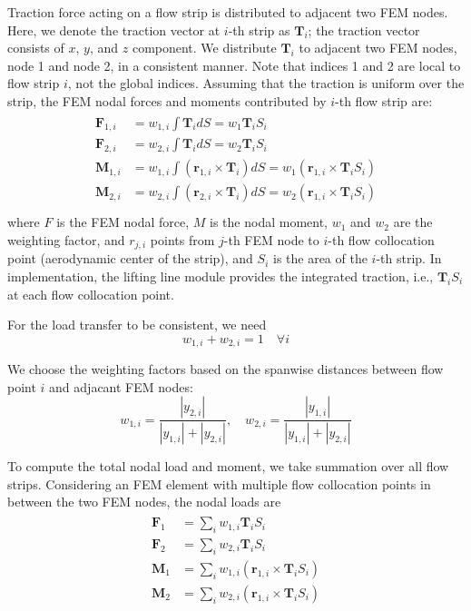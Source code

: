 \documentclass[10pt]{article}
\newcommand{\mb}[1]{\boldsymbol{\mathbf{#1}}} %
\begin{document}
Traction force acting on a flow strip is distributed to adjacent two FEM nodes.
Here, we denote the traction vector at $i$-th strip as $\mb{T}_i$; the traction vector consists of $x$, $y$, and $z$ component.
We distribute $\mb{T}_i$ to adjacent two FEM nodes, node 1 and node 2, in a consistent manner.
Note that indices 1 and 2 are local to flow strip $i$, not the global indices.
Assuming that the traction is uniform over the strip, the FEM nodal forces and moments contributed by $i$-th flow strip are:
\begin{align}
\begin{aligned}
	\mb{F}_{1,i} &= w_{1,i} \int \mb{T}_i dS = w_1 \mb{T}_i S_i\\
	\mb{F}_{2,i} &= w_{2,i} \int\mb{T}_i dS = w_2 \mb{T}_i S_i\\
	\mb{M}_{1,i} &= w_{1,i} \int \left( \mb{r}_{1, i} \times \mb{T}_i \right) dS = w_1 \left( \mb{r}_{1, i} \times \mb{T}_i S_i \right)  \\
	\mb{M}_{2,i} &= w_{2,i} \int \left( \mb{r}_{2, i} \times \mb{T}_i \right) dS = w_2 \left( \mb{r}_{1, i} \times \mb{T}_i S_i \right)  \\
\end{aligned}
\end{align}
where $F$ is the FEM nodal force, $M$ is the nodal moment, $w_1$ and $w_2$ are the weighting factor, and $r_{j, i}$ points from $j$-th FEM node to $i$-th flow collocation point (aerodynamic center of the strip), and $S_i$ is the area of the $i$-th strip.
In implementation, the lifting line module provides the integrated traction, i.e., $\mb{T}_i S_i$ at each flow collocation point.

For the load transfer to be consistent, we need
\begin{equation}
	w_{1,i} + w_{2,i} = 1 \quad \forall i
\end{equation}

We choose the weighting factors based on the spanwise distances between flow point $i$ and adjacant FEM nodes:
\begin{equation}
	w_{1,i} = \frac{|y_{2, i}|}{|y_{1, i}| + |y_{2, i}|}, \quad w_{2,i} = \frac{|y_{1, i}|}{|y_{1, i}| + |y_{2, i}|}
\end{equation}

To compute the total nodal load and moment, we take summation over all flow strips.
Considering an FEM element with multiple flow collocation points in between the two FEM nodes, the nodal loads are
\begin{align}
\begin{aligned}
	\mb{F}_1 &= \sum_i w_{1,i} \mb{T}_i S_i \\
	\mb{F}_2 &= \sum_i w_{2,i} \mb{T}_i S_i \\
	\mb{M}_1 &= \sum_i w_{1,i} \left( \mb{r}_{1, i} \times \mb{T}_i S_i \right) \\
	\mb{M}_2 &= \sum_i w_{2,i} \left( \mb{r}_{1, i} \times \mb{T}_i S_i \right)  \\
\end{aligned}
\end{align}
\end{document}
